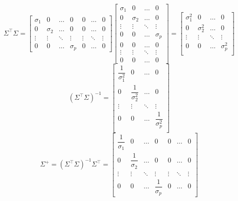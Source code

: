 \[
    \Sigma^\intercal \Sigma = \begin{bmatrix}
        \sigma_1 & 0 & \dots & 0 & 0 & \dots & 0\\
        0 & \sigma_2 & \dots & 0 & 0 & \dots & 0\\
        \vdots & \vdots & \ddots & \vdots & \vdots & \ddots & \vdots\\
        0 & 0 & \dots & \sigma_p & 0 & \dots & 0
    \end{bmatrix} 
    \begin{bmatrix}
        \sigma_1 & 0 & \dots & 0\\
        0 & \sigma_2 & \dots & 0\\
        \vdots & \vdots & \ddots & \vdots\\
        0 & 0 & \dots & \sigma_p\\
        0 & 0 & \dots & 0\\
        \vdots & \vdots & \ddots & \vdots\\
        0 & 0 & \dots & 0
    \end{bmatrix}
    =
    \begin{bmatrix}
        \sigma_1^2 & 0 & \dots & 0\\
        0 & \sigma_2^2 & \dots & 0\\
        \vdots & \vdots & \ddots & \vdots\\
        0 & 0 & \dots & \sigma_p^2\\
    \end{bmatrix}
\]
\[
    (\Sigma^\intercal \Sigma)^{-1} = \begin{bmatrix}
        \dfrac{1}{\sigma_1^2} & 0 & \dots & 0\\
        0 & \dfrac{1}{\sigma_2^2} & \dots & 0\\
        \vdots & \vdots & \ddots & \vdots\\
        0 & 0 & \dots & \dfrac{1}{\sigma_p^2}\\
    \end{bmatrix}    
\]
\[
    \Sigma^+ =  (\Sigma^\intercal \Sigma)^{-1} \Sigma^\intercal = \begin{bmatrix}
        \dfrac{1}{\sigma_1} & 0 & \dots & 0 & 0 & \dots & 0\\
        0 & \dfrac{1}{\sigma_2} & \dots & 0 & 0 & \dots & 0\\
        \vdots & \vdots & \ddots & \vdots & \vdots & \ddots & \vdots\\
        0 & 0 & \dots & \dfrac{1}{\sigma_p} & 0 & \dots & 0
    \end{bmatrix}
\]

